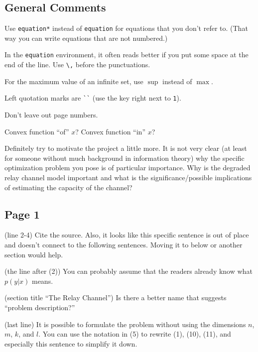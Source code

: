 \documentclass[10pt]{article}
\newenvironment{tight_itemize}
{\begin{itemize}
  \setlength{\itemsep}{0pt}
  \setlength{\parskip}{0pt}
  \setlength{\parsep}{0pt}}
{\end{itemize}}
\begin{document}
\subsection*{General Comments}
\begin{tight_itemize}
\item Use \verb'equation*' instead of \verb'equation' for equations that you don't refer to. (That way you can write equations that are not numbered.)
\item In the \verb'equation' environment, it often reads better if you put some space at the end of the line. Use \verb'\,' before the punctuations.
\item For the maximum value of an infinite set, use $\sup$ instead of $\max$.
\item Left quotation marks are \verb'``' (use the key right next to \verb'1').
\item Don't leave out page numbers.
\item Convex function ``of'' $x$? Convex function ``in'' $x$?
\item Definitely try to motivate the project a little more. It is not very clear (at least for someone without much background in information theory) why the specific optimization problem you pose is of particular importance. Why is the degraded relay channel model important and what is the significance/possible implications of estimating the capacity of the channel?
\end{tight_itemize}

\subsection*{Page 1}
\begin{tight_itemize}
\item (line 2-4) Cite the source. Also, it looks like this specific sentence is out of place and doesn't connect to the following sentences. Moving it to below or another section would help.
\item (the line after (2)) You can probably assume that the readers already know what $p(y|x)$ means.
\item (section title ``The Relay Channel'') Is there a better name that suggests ``problem description?''
\item (last line) It is possible to formulate the problem without using the dimensions $n$, $m$, $k$, and $l$. You can use the notation in (5) to rewrite (1), (10), (11), and especially this sentence to simplify it down.
\end{tight_itemize}
\end{document}
